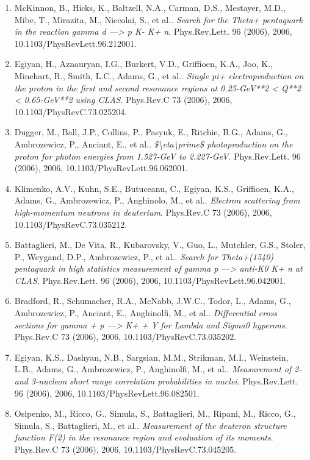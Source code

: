 \begin{enumerate}
\item McKinnon, B., Hicks, K., Baltzell, N.A., Carman, D.S., Mestayer, M.D., Mibe, T., Mirazita, M., Niccolai, S., et al.. \textit{Search for the Theta+ pentaquark in the reaction gamma d ---> p K- K+ n}. Phys.Rev.Lett. 96 (2006), 2006, 10.1103/PhysRevLett.96.212001.
\item Egiyan, H., Aznauryan, I.G., Burkert, V.D., Griffioen, K.A., Joo, K., Minehart, R., Smith, L.C., Adams, G., et al.. \textit{Single pi+ electroproduction on the proton in the first and second resonance regions at 0.25-GeV**2 < Q**2 < 0.65-GeV**2 using CLAS}. Phys.Rev.C 73 (2006), 2006, 10.1103/PhysRevC.73.025204.
\item Dugger, M., Ball, J.P., Collins, P., Pasyuk, E., Ritchie, B.G., Adams, G., Ambrozewicz, P., Anciant, E., et al.. \textit{\$\textbackslash{}eta\textbackslash{}prime\$ photoproduction on the proton for photon energies from 1.527-GeV to 2.227-GeV}. Phys.Rev.Lett. 96 (2006), 2006, 10.1103/PhysRevLett.96.062001.
\item Klimenko, A.V., Kuhn, S.E., Butuceanu, C., Egiyan, K.S., Griffioen, K.A., Adams, G., Ambrozewicz, P., Anghinolo, M., et al.. \textit{Electron scattering from high-momentum neutrons in deuterium}. Phys.Rev.C 73 (2006), 2006, 10.1103/PhysRevC.73.035212.
\item Battaglieri, M., De Vita, R., Kubarovsky, V., Guo, L., Mutchler, G.S., Stoler, P., Weygand, D.P., Ambrozewicz, P., et al.. \textit{Search for Theta+(1540) pentaquark in high statistics measurement of gamma p ---> anti-K0 K+ n at CLAS}. Phys.Rev.Lett. 96 (2006), 2006, 10.1103/PhysRevLett.96.042001.
\item Bradford, R., Schumacher, R.A., McNabb, J.W.C., Todor, L., Adams, G., Ambrozewicz, P., Anciant, E., Anghinolfi, M., et al.. \textit{Differential cross sections for gamma + p ---> K+ + Y for Lambda and Sigma0 hyperons}. Phys.Rev.C 73 (2006), 2006, 10.1103/PhysRevC.73.035202.
\item Egiyan, K.S., Dashyan, N.B., Sargsian, M.M., Strikman, M.I., Weinstein, L.B., Adams, G., Ambrozewicz, P., Anghinolfi, M., et al.. \textit{Measurement of 2- and 3-nucleon short range correlation probabilities in nuclei}. Phys.Rev.Lett. 96 (2006), 2006, 10.1103/PhysRevLett.96.082501.
\item Osipenko, M., Ricco, G., Simula, S., Battaglieri, M., Ripani, M., Ricco, G., Simula, S., Battaglieri, M., et al.. \textit{Measurement of the deuteron structure function F(2) in the resonance region and evaluation of its moments}. Phys.Rev.C 73 (2006), 2006, 10.1103/PhysRevC.73.045205.

\end{enumerate}
